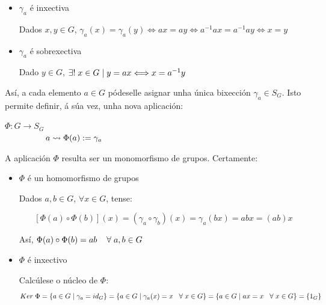 \documentclass[twoside]{report}
\theoremstyle{mystyle}
\begin{document}
\begin{itemize}
    
    \item $\gamma_{a}$ é inxectiva
    
    Dados $x,y \in G$, $\gamma_{a}(x) = \gamma_{a}(y) \Longleftrightarrow ax = ay \Longleftrightarrow a^{-1}ax = a^{-1}ay \Longleftrightarrow x = y$
    
    \item $\gamma_{a}$ é sobrexectiva
    
    Dado $y \in G$, $\exists! \hspace{1mm} x \in G \hspace{1mm} | \hspace{1mm} y = ax \Longleftrightarrow x = a^{-1}y$
    
\end{itemize}

\noindent Así, a cada elemento $a \in G$ pódeselle asignar unha única bixección $\gamma_{a} \in S_{G}$. Isto permite definir, á súa vez, unha nova aplicación: \\

    \begin{center}
            $\Phi: G \longrightarrow S_{G}$ \\
        \vspace{2mm}
        $\hspace{17mm} a \leadsto \Phi(a) := \gamma_{a}$
    \end{center} 
    
\noindent A aplicación $\Phi$ resulta ser un monomorfismo de grupos. Certamente:

\begin{itemize}
    
    \item $\Phi$ é un homomorfismo de grupos
    
    Dados $a,b \in G$, $\forall x \in G$, tense: 
    
    $$[\Phi(a) \circ \Phi(b)](x) = (\gamma_{a} \circ \gamma_{b})(x) = \gamma_{a}(bx) = abx = (ab)x$$
    
    Así, $\Phi(a) \circ \Phi(b) = ab \hspace{4mm} \forall \hspace{1mm} a,b \in G$
    
    \item $\Phi$ é inxectivo
    
    Calcúlese o núcleo de $\Phi$:
    $$Ker \hspace{1mm} \Phi = \{ a \in G \hspace{1mm} | \hspace{1mm} \gamma_{a} = id_{G} \} = \{ a \in G \hspace{1mm} | \hspace{1mm} \gamma_{a}(x) = x \hspace{3mm} \forall \hspace{1mm} x \in G \} = \{ a \in G \hspace{1mm} | \hspace{1mm} ax = x \hspace{3mm} \forall \hspace{1mm} x \in G \} = \{1_{G}\}$$
    
\end{itemize}
\end{document}
